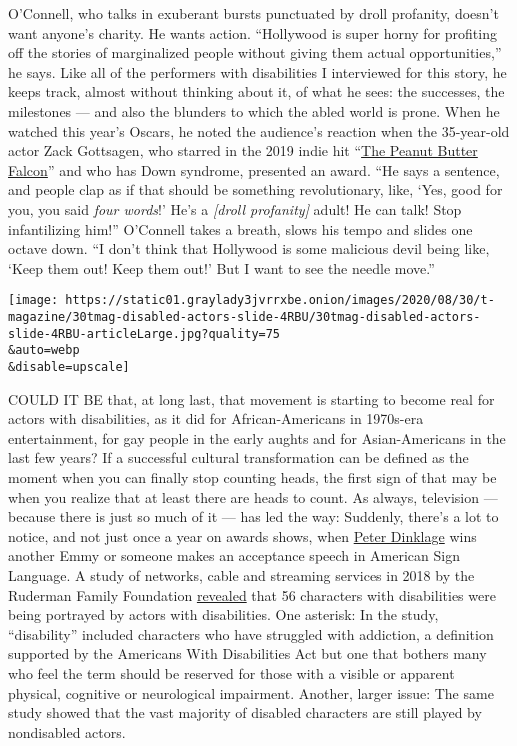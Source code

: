 O'Connell, who talks in exuberant bursts punctuated by droll profanity,
doesn't want anyone's charity. He wants action. ``Hollywood is super
horny for profiting off the stories of marginalized people without
giving them actual opportunities,'' he says. Like all of the performers
with disabilities I interviewed for this story, he keeps track, almost
without thinking about it, of what he sees: the successes, the
milestones --- and also the blunders to which the abled world is prone.
When he watched this year's Oscars, he noted the audience's reaction
when the 35-year-old actor Zack Gottsagen, who starred in the 2019 indie
hit
``\href{https://www.nytimes3xbfgragh.onion/2019/08/08/movies/the-peanut-butter-falcon-review.html}{The
Peanut Butter Falcon}'' and who has Down syndrome, presented an award.
``He says a sentence, and people clap as if that should be something
revolutionary, like, `Yes, good for you, you said \emph{four words}!'
He's a \emph{{[}droll profanity{]}} adult! He can talk! Stop
infantilizing him!'' O'Connell takes a breath, slows his tempo and
slides one octave down. ``I don't think that Hollywood is some malicious
devil being like, `Keep them out! Keep them out!' But I want to see the
needle move.''

\texttt{[image: https://static01.graylady3jvrrxbe.onion/images/2020/08/30/t-magazine/30tmag-disabled-actors-slide-4RBU/30tmag-disabled-actors-slide-4RBU-articleLarge.jpg?quality=75\\\&auto=webp\\\&disable=upscale]}

COULD IT BE that, at long last, that movement is starting to become real
for actors with disabilities, as it did for African-Americans in
1970s-era entertainment, for gay people in the early aughts and for
Asian-Americans in the last few years? If a successful cultural
transformation can be defined as the moment when you can finally stop
counting heads, the first sign of that may be when you realize that at
least there are heads to count. As always, television --- because there
is just so much of it --- has led the way: Suddenly, there's a lot to
notice, and not just once a year on awards shows, when
\href{https://www.nytimes3xbfgragh.onion/2012/04/01/magazine/peter-dinklage-was-smart-to-say-no.html}{Peter
Dinklage} wins another Emmy or someone makes an acceptance speech in
American Sign Language. A study of networks, cable and streaming
services in 2018 by the Ruderman Family Foundation
\href{https://rudermanfoundation.org/white_papers/the-ruderman-white-paper-on-authentic-representation-in-tv/}{revealed}
that 56 characters with disabilities were being portrayed by actors with
disabilities. One asterisk: In the study, ``disability'' included
characters who have struggled with addiction, a definition supported by
the Americans With Disabilities Act but one that bothers many who feel
the term should be reserved for those with a visible or apparent
physical, cognitive or neurological impairment. Another, larger issue:
The same study showed that the vast majority of disabled characters are
still played by nondisabled actors.


